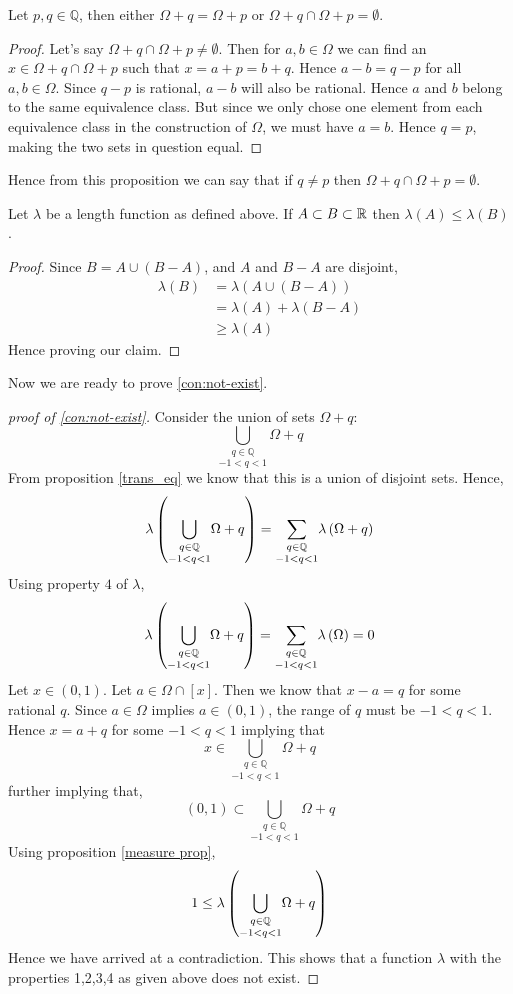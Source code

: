 \begin{proposition}
  Let $p,q\in \mathbb{Q}$, then either $\Omega+q=\Omega+p$ or $\Omega+q\cap\Omega+p=\emptyset$.
  \label{trans_eq}
\end{proposition}
\begin{proof}
  Let's say $\Omega+q\cap\Omega+p\neq\emptyset$. Then for $a,b \in \Omega$ we can find an $x\in\Omega+q\cap\Omega+p$ such that $x=a+p=b+q$. Hence $a-b = q-p$ for all $a,b\in\Omega$. Since $q-p$ is rational, $a-b$ will also be rational. Hence $a$ and $b$ belong to the same equivalence class. But since we only chose one element from each equivalence class in the construction of $\Omega$, we must have $a=b$. Hence $q=p$, making the two sets in question equal. 
\end{proof}
Hence from this proposition we can say that if $q\neq p$ then $\Omega+q\cap\Omega+p=\emptyset$.
\begin{proposition}
  Let $\lambda$ be a length function as defined above. If $A\subset B\subset\mathbb{R}$ then $\lambda(A)\leq \lambda(B)$.
  \label{measure prop}
\end{proposition}
\begin{proof}
 Since $B = A \cup (B-A)$, and $A$ and $B-A$ are disjoint,
 \begin{align*}
   \lambda(B) &= \lambda(A \cup (B-A))\\
        &= \lambda(A) + \lambda(B-A)\\
        &\geq \lambda(A)
 \end{align*}
 Hence proving our claim.
\end{proof}
Now we are ready to prove \cref{con:not-exist}.
\begin{proof}[proof of \cref{con:not-exist}]
  Consider the union of sets $\Omega+q$:
  \[\underset{-1<q<1}{\bigcup_{q\in \mathbb{Q}}}\Omega+q\]
  From proposition \ref{trans_eq} we know that this is a union of disjoint sets. Hence,
  \[\lambda\left(\underset{-1<q<1}{\bigcup_{q\in \mathbb{Q}}}\Omega+q\right) = \underset{-1<q<1}{\sum_{q\in \mathbb{Q}}}\lambda\left(\Omega+q\right)\]
  Using property $4$ of $\lambda$, 
  \[\lambda\left(\underset{-1<q<1}{\bigcup_{q\in \mathbb{Q}}}\Omega+q\right) = \underset{-1<q<1}{\sum_{q\in \mathbb{Q}}}\lambda\left(\Omega\right) = 0\]
  Let $x\in (0,1)$. Let $a\in \Omega\cap [x]$. Then we know that $x-a = q$ for some rational $q$. Since $a\in\Omega$ implies $a\in (0,1)$, the range of $q$ must be $-1<q<1$. Hence $x = a + q$ for some $-1<q<1$ implying that
 \[x \in \underset{-1<q<1}{\bigcup_{q\in \mathbb{Q}}}\Omega+q\]
 further implying that,
 \[(0,1) \subset \underset{-1<q<1}{\bigcup_{q\in \mathbb{Q}}}\Omega+q\]
 Using proposition \ref{measure prop},
 \[1 \leq \lambda\left(\underset{-1<q<1}{\bigcup_{q\in \mathbb{Q}}}\Omega+q\right)\]
 Hence we have arrived at a contradiction. This shows that a function $\lambda$ with the properties 1,2,3,4 as given above does not exist.
\end{proof}
